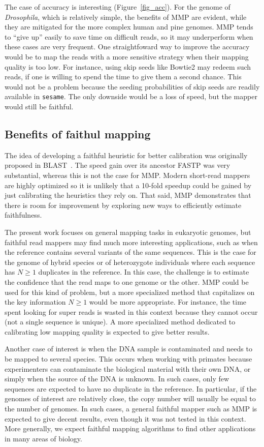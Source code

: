 \documentclass[a4,center,fleqn]{NAR}
\begin{document}
The case of accuracy is interesting (Figure~\ref{fig_acc}). For  the
genome of \textit{Drosophila}, which is relatively simple, the benefits of
MMP  are evident, while they are mitigated for the more complex human and
pine genomes. MMP tends to ``give up'' easily to save time on difficult
reads, so it may underperform when these cases are very frequent. One
straightfoward way to improve the accuracy would be to map the reads with
a more sensitive strategy when their mapping quality is too low. For
instance, using skip seeds like Bowtie2 may redeem such reads, if one is
willing to spend the time to give them a second chance. This would not be
a problem because the seeding probabilities of skip seeds are readily
available in \texttt{sesame}. The only downside would be a loss of speed,
but the mapper would still be faithful.


\subsection{Benefits of faithul mapping}

The idea of developing a faithful heuristic for better calibration was
originally proposed in BLAST~\cite{pmid2231712}. The speed gain over its
ancestor FASTP was very substantial, whereas this is not the case for MMP.
Modern short-read mappers are highly optimized so it is unlikely that a
10-fold speedup could be gained by just calibrating the heuristics they
rely on. That said, MMP demonstrates that there is room for improvement by
exploring new ways to efficiently estimate faithfulness.

The present work focuses on general mapping tasks in eukaryotic genomes,
but faithful read mappers may find much more interesting applications,
such as when the reference contains several variants of the same
sequences. This is the case for the genome of hybrid species or of
heterozygote individuals where each sequence has $N \geq 1$ duplicates in
the reference. In this case, the challenge is to estimate the confidence
that the read maps to one genome or the other. MMP could be used for this
kind of problem, but a more specialized method that capitalizes on the key
information $N \geq 1$ would be more appropriate. For instance, the time
spent looking for super reads is wasted in this context because they
cannot occur (not a single sequence is unique). A more specialized method
dedicated to calibrating low mapping quality is expected to give better
results.

Another case of interest is when the DNA sample is contaminated and needs
to be mapped to several species. This occurs when working with primates
because experimenters can contaminate the biological material with their
own DNA, or simply when the source of the DNA is unknown. In such cases,
only few sequences are expected to have no duplicate in the reference. In
particular, if the genomes of interest are relatively close, the copy
number will usually be equal to the number of genomes. In such cases, a
general faithful mapper such as MMP is expected to give decent results,
even though it was not tested in this context. More generally, we expect
faithful mapping algorithms to find other applications in many areas of
biology. 
\end{document}
